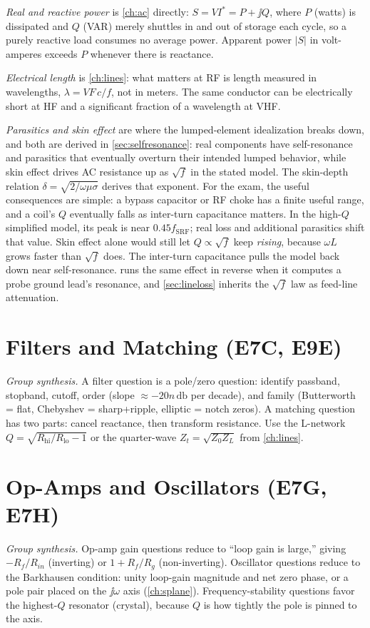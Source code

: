 \emph{Real and reactive power} is \cref{ch:ac} directly: \(S=VI^{*}=P+\jj Q\), where
\(P\) (watts) is dissipated and \(Q\) (VAR) merely shuttles in and out of storage each
cycle, so a purely reactive load consumes no average power. Apparent power \(|S|\) in
volt-amperes exceeds \(P\) whenever there is reactance.

\emph{Electrical length} is \cref{ch:lines}: what matters at RF is length measured in
wavelengths, \(\lambda=VF\,c/f\), not in meters. The same conductor can be
electrically short at HF and a significant fraction of a wavelength at VHF.

\emph{Parasitics and skin effect} are where the lumped-element idealization breaks
down, and both are derived in \cref{sec:selfresonance}: real components have
self-resonance and parasitics that eventually overturn their intended lumped behavior,
while skin effect drives AC resistance up as \(\sqrt f\) in the stated model. The
skin-depth relation \(\delta=\sqrt{2/\omega\mu\sigma}\) derives that exponent. For
the exam, the useful consequences are simple: a bypass capacitor or RF choke has a
finite useful range, and a coil's \(Q\) eventually falls as inter-turn
capacitance matters. In the high-\(Q\) simplified model, its peak is near
\(0.45f_{\mathrm{SRF}}\); real loss and additional parasitics shift that value. Skin
effect alone would still let \(Q\propto\sqrt f\) keep \emph{rising}, because
\(\omega L\) grows faster than \(\sqrt f\) does. The inter-turn capacitance pulls the
model back down near self-resonance.  runs the same
effect in reverse when it computes a probe ground lead's resonance, and
\cref{sec:lineloss} inherits the \(\sqrt f\) law as feed-line attenuation.

\section{Filters and Matching (E7C, E9E)}
\emph{Group synthesis.}
A filter question is a pole/zero question: identify passband, stopband, cutoff,
order (slope \(\approx-20n\,\si{\decibel}\) per decade), and family
(Butterworth = flat, Chebyshev = sharp+ripple, elliptic = notch zeros). A
matching question has two parts: cancel reactance, then transform resistance. Use
the L-network \(Q=\sqrt{R_{\text{hi}}/R_{\text{lo}}-1}\) or the quarter-wave
\(Z_t=\sqrt{Z_0Z_L}\) from \cref{ch:lines}.

\section{Op-Amps and Oscillators (E7G, E7H)}
\emph{Group synthesis.}
Op-amp gain questions reduce to ``loop gain is large,'' giving
\(-R_f/R_{in}\) (inverting) or \(1+R_f/R_g\) (non-inverting). Oscillator questions
reduce to the Barkhausen condition: unity loop-gain magnitude and net zero phase,
or a pole pair placed on the \(\jj\omega\) axis
(\cref{ch:splane}). Frequency-stability questions favor the highest-\(Q\)
resonator (crystal), because \(Q\) is how tightly the pole is pinned to the axis.

